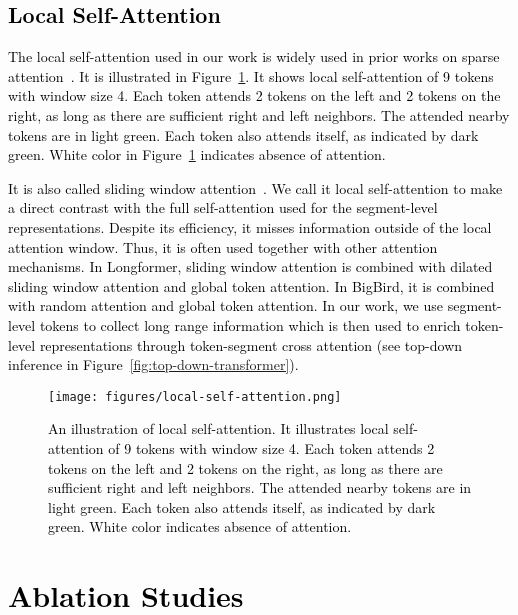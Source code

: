 \subsection{\textcolor{black}{Local Self-Attention}}
\label{sec:supp-local-self-attn}
\textcolor{black}{The local self-attention used in our work is widely used in prior works on sparse attention~\citep{beltagy2020longformer, zaheer2020big}. It is illustrated in Figure~\ref{fig:local-self-attention}. It shows local self-attention of 9 tokens with window size 4. Each token attends 2 tokens on the left and 2 tokens on the right, as long as there are sufficient right and left neighbors. The attended nearby tokens are in light green. Each token also attends itself, as indicated by dark green. White color in Figure~\ref{fig:local-self-attention} indicates absence of attention.}

\textcolor{black}{It is also called sliding window attention~\citep{beltagy2020longformer}. We call it local self-attention to make a direct contrast with the full self-attention used for the segment-level representations. Despite its efficiency, it misses information outside of the local attention window. Thus, it is often used together with other attention mechanisms. In Longformer, sliding window attention is combined with dilated sliding window attention and global token attention. In BigBird, it is combined with random attention and global token attention. In our work, we use segment-level tokens to collect long range information which is then used to enrich token-level representations through token-segment cross attention (see top-down inference in Figure~\ref{fig:top-down-transformer}). }

\begin{figure}[!htbp]
    \centering
    \texttt{[image: figures/local-self-attention.png]}
    \caption{\footnotesize \textcolor{black}{An illustration of local self-attention. It illustrates local self-attention of 9 tokens with window size 4. Each token attends 2 tokens on the left and 2 tokens on the right, as long as there are sufficient right and left neighbors. The attended nearby tokens are in light green. Each token also attends itself, as indicated by dark green. White color indicates absence of attention.} }
    \label{fig:local-self-attention}
\end{figure}

\clearpage
\section{\textcolor{black}{Ablation Studies}}


